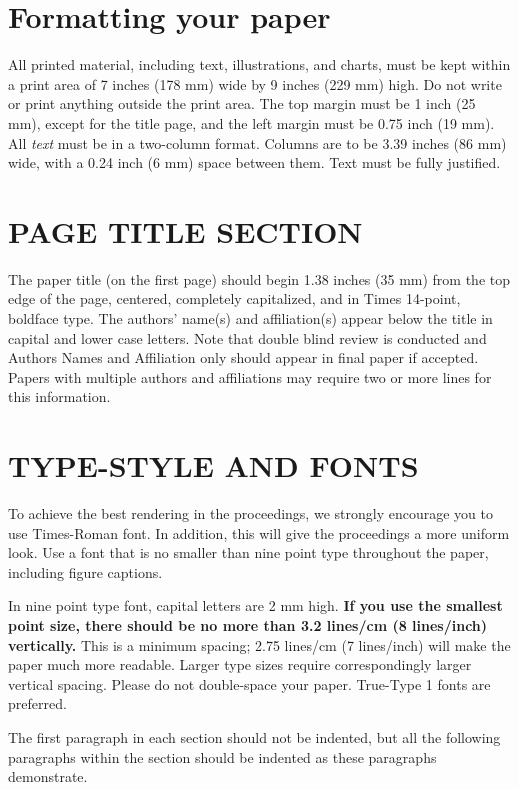 \documentclass{article}
\begin{document}
\section{Formatting your paper}
\label{sec:format}

All printed material, including text, illustrations, and charts, must be kept
within a print area of 7 inches (178 mm) wide by 9 inches (229 mm) high. Do
not write or print anything outside the print area. The top margin must be 1
inch (25 mm), except for the title page, and the left margin must be 0.75 inch
(19 mm).  All {\it text} must be in a two-column format. Columns are to be 3.39
inches (86 mm) wide, with a 0.24 inch (6 mm) space between them. Text must be
fully justified.

\section{PAGE TITLE SECTION}
\label{sec:pagestyle}

The paper title (on the first page) should begin 1.38 inches (35 mm) from the
top edge of the page, centered, completely capitalized, and in Times 14-point,
boldface type.  The authors' name(s) and affiliation(s) appear below the title
in capital and lower case letters. Note that double blind review is conducted and Authors Names and Affiliation only should appear in final paper if accepted. Papers with multiple authors and
affiliations may require two or more lines for this information.

\section{TYPE-STYLE AND FONTS}
\label{sec:typestyle}

To achieve the best rendering in the proceedings, we
strongly encourage you to use Times-Roman font.  In addition, this will give
the proceedings a more uniform look.  Use a font that is no smaller than nine
point type throughout the paper, including figure captions.

In nine point type font, capital letters are 2 mm high.  {\bf If you use the
smallest point size, there should be no more than 3.2 lines/cm (8 lines/inch)
vertically.}  This is a minimum spacing; 2.75 lines/cm (7 lines/inch) will make
the paper much more readable.  Larger type sizes require correspondingly larger
vertical spacing.  Please do not double-space your paper.  True-Type 1 fonts
are preferred.

The first paragraph in each section should not be indented, but all the
following paragraphs within the section should be indented as these paragraphs
demonstrate.
\end{document}
